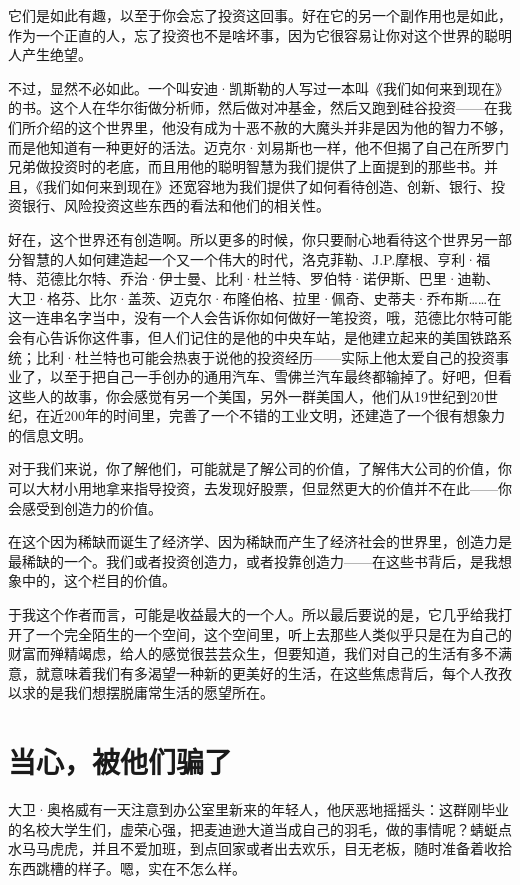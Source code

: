 它们是如此有趣，以至于你会忘了投资这回事。好在它的另一个副作用也是如此，作为一个正直的人，忘了投资也不是啥坏事，因为它很容易让你对这个世界的聪明人产生绝望。

不过，显然不必如此。一个叫安迪·凯斯勒的人写过一本叫《我们如何来到现在》的书。这个人在华尔街做分析师，然后做对冲基金，然后又跑到硅谷投资------在我们所介绍的这个世界里，他没有成为十恶不赦的大魔头并非是因为他的智力不够，而是他知道有一种更好的活法。迈克尔·刘易斯也一样，他不但揭了自己在所罗门兄弟做投资时的老底，而且用他的聪明智慧为我们提供了上面提到的那些书。并且，《我们如何来到现在》还宽容地为我们提供了如何看待创造、创新、银行、投资银行、风险投资这些东西的看法和他们的相关性。

好在，这个世界还有创造啊。所以更多的时候，你只要耐心地看待这个世界另一部分智慧的人如何建造起一个又一个伟大的时代，洛克菲勒、J.P.摩根、亨利·福特、范德比尔特、乔治·伊士曼、比利·杜兰特、罗伯特·诺伊斯、巴里·迪勒、大卫·格芬、比尔·盖茨、迈克尔·布隆伯格、拉里·佩奇、史蒂夫·乔布斯\ldots{}\ldots{}在这一连串名字当中，没有一个人会告诉你如何做好一笔投资，哦，范德比尔特可能会有心告诉你这件事，但人们记住的是他的中央车站，是他建立起来的美国铁路系统；比利·杜兰特也可能会热衷于说他的投资经历------实际上他太爱自己的投资事业了，以至于把自己一手创办的通用汽车、雪佛兰汽车最终都输掉了。好吧，但看这些人的故事，你会感觉有另一个美国，另外一群美国人，他们从19世纪到20世纪，在近200年的时间里，完善了一个不错的工业文明，还建造了一个很有想象力的信息文明。

对于我们来说，你了解他们，可能就是了解公司的价值，了解伟大公司的价值，你可以大材小用地拿来指导投资，去发现好股票，但显然更大的价值并不在此------你会感受到创造力的价值。

在这个因为稀缺而诞生了经济学、因为稀缺而产生了经济社会的世界里，创造力是最稀缺的一个。我们或者投资创造力，或者投靠创造力------在这些书背后，是我想象中的，这个栏目的价值。

于我这个作者而言，可能是收益最大的一个人。所以最后要说的是，它几乎给我打开了一个完全陌生的一个空间，这个空间里，听上去那些人类似乎只是在为自己的财富而殚精竭虑，给人的感觉很芸芸众生，但要知道，我们对自己的生活有多不满意，就意味着我们有多渴望一种新的更美好的生活，在这些焦虑背后，每个人孜孜以求的是我们想摆脱庸常生活的愿望所在。

\section{当心，被他们骗了}

大卫·奥格威有一天注意到办公室里新来的年轻人，他厌恶地摇摇头：这群刚毕业的名校大学生们，虚荣心强，把麦迪逊大道当成自己的羽毛，做的事情呢？蜻蜓点水马马虎虎，并且不爱加班，到点回家或者出去欢乐，目无老板，随时准备着收拾东西跳槽的样子。嗯，实在不怎么样。

